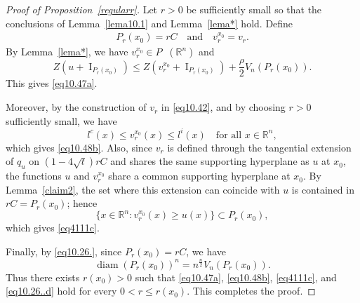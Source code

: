 \documentclass[10pt,a4paper]{amsart}
\DeclareMathOperator{\I}{I}
\DeclareMathOperator{\LQ}{_{l.q}}
\newcommand{\RR}{(\mathbb{R}^n)}
\DeclareMathOperator{\diam}{diam}
\begin{document}
\begin{proof}[Proof of Proposition~\ref{regularr}]
Let $r>0$ be sufficiently small so that the conclusions of Lemma~\ref{lema10.1} and Lemma~\ref{lema*} hold. Define
\begin{align}\label{eq10.44}
    P_r(x_0)=rC
    \quad \text{and} \quad
    v_r^{x_0}=v_r.
\end{align}
By Lemma~\ref{lema*}, we have $v_r^{x_0}\in P\LQ\RR$ and
\[
Z(u+\I_{P_r(x_0)})
\le
Z(v_r^{x_0}+\I_{P_r(x_0)})
+\frac{\rho}{2}V_n(P_r(x_0)).
\]
This gives \eqref{eq10.47a}.

Moreover, by the construction of $v_r$ in \eqref{eq10.42}, and by choosing $r>0$ sufficiently small, we have
\[
l^c(x)\leq v_r^{x_0}(x)\leq l^i(x)
\quad \text{for all } x\in\mathbb{R}^n,
\]
which gives \eqref{eq10.48b}. Also, since $v_r$ is defined through the tangential extension of $q_u$ on $(1-4\sqrt{t})rC$ and shares the same supporting hyperplane as $u$ at $x_0$, the functions $u$ and $v_r^{x_0}$ share a common supporting hyperplane at $x_0$. By Lemma~\ref{claim2}, the set where this extension can coincide with $u$ is contained in $rC=P_r(x_0)$; hence
\[
\{x\in\mathbb{R}^n: v_r^{x_0}(x)\geq u(x)\}
\subset P_r(x_0),
\]
which gives \eqref{eq4111c}.

Finally, by \eqref{eq10.26.}, since $P_r(x_0)=rC$, we have
\[
\diam(P_r(x_0))^n
=
n^{\frac n2}V_n(P_r(x_0)).
\]
Thus there exists $r(x_0)>0$ such that \eqref{eq10.47a}, \eqref{eq10.48b}, \eqref{eq4111c}, and \eqref{eq10.26..d} hold for every $0<r\le r(x_0)$. This completes the proof.
\end{proof}
\end{document}
